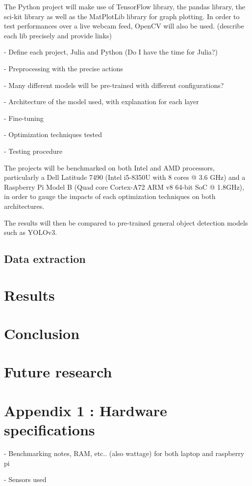 \documentclass[12pt]{article}
\begin{document}
The Python project will make use of TensorFlow library, the pandas library, the sci-kit library as well as the MatPlotLib library for graph plotting. In order to test performances over a live webcam feed, OpenCV will also be used.
(describe each lib precisely and provide links)

- Define each project, Julia and Python (Do I have the time for Julia?)

- Preprocessing with the precise actions

- Many different models will be pre-trained with different configurations?

- Architecture of the model used, with explanation for each layer

- Fine-tuning

- Optimization techniques tested

- Testing procedure

The projects will be benchmarked on both Intel and AMD processors, particularly a Dell Latitude 7490 (Intel i5-8350U with 8 cores @ 3.6 GHz) and a Raspberry Pi Model B (Quad core Cortex-A72 ARM v8 64-bit SoC @ 1.8GHz), in order to gauge the impacts of each optimization techniques on both architectures.

The results will then be compared to pre-trained general object detection models such as YOLOv3.

\subsection{Data extraction}

\section{Results}

\section{Conclusion}

\section{Future research}

\section{Appendix 1 : Hardware specifications}

- Benchmarking notes, RAM, etc.. (also wattage) for both laptop and raspberry pi

- Sensors used
\end{document}
